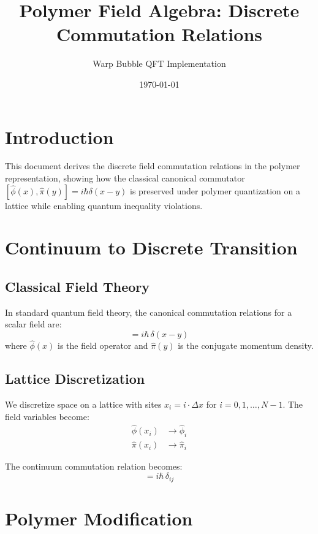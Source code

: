 \documentclass[12pt]{article}
\title{Polymer Field Algebra: Discrete Commutation Relations}
\author{Warp Bubble QFT Implementation}
\date{\today}
\begin{document}
\maketitle

\section{Introduction}

This document derives the discrete field commutation relations in the polymer representation, showing how the classical canonical commutator $[\hat{\phi}(x), \hat{\pi}(y)] = i\hbar\delta(x-y)$ is preserved under polymer quantization on a lattice while enabling quantum inequality violations.

\section{Continuum to Discrete Transition}

\subsection{Classical Field Theory}

In standard quantum field theory, the canonical commutation relations for a scalar field are:
\begin{equation}
[\hat{\phi}(x), \hat{\pi}(y)] = i\hbar\,\delta(x-y)
\end{equation}
where $\hat{\phi}(x)$ is the field operator and $\hat{\pi}(y)$ is the conjugate momentum density.

\subsection{Lattice Discretization}

We discretize space on a lattice with sites $x_i = i \cdot \Delta x$ for $i = 0, 1, \ldots, N-1$. The field variables become:
\begin{align}
\hat{\phi}(x_i) &\rightarrow \hat{\phi}_i \\
\hat{\pi}(x_i) &\rightarrow \hat{\pi}_i
\end{align}

The continuum commutation relation becomes:
\begin{equation}
[\hat{\phi}_i, \hat{\pi}_j] = i\hbar\,\delta_{ij}
\end{equation}

\section{Polymer Modification}
\end{document}
